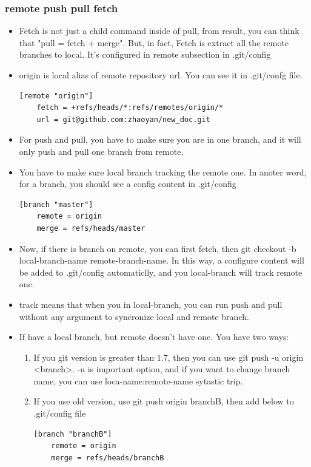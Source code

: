 \documentclass[a4paper,12pt,twoside]{book}
\begin{document}
\subsubsection{remote push pull fetch}
\begin{itemize}
		\item Fetch is not just a child command inside of pull, from result, you can think that "pull = fetch + merge". But, in fact, Fetch is extract all the remote branches to local. It's configured in remote subsection in .git/config

		\item origin is local alias of remote repository url. You can see it in .git/confg file.  

\begin{verbatim}
[remote "origin"]
	fetch = +refs/heads/*:refs/remotes/origin/*
	url = git@github.com:zhaoyan/new_doc.git
\end{verbatim}
				
\item For push and pull, you have to make sure you are in one branch, and it will only push and pull one branch from remote. 

\item You have to make sure local branch tracking the remote one. In anoter word, for a branch, you should see a config content in .git/config
\begin{verbatim}
[branch "master"]
	remote = origin
	merge = refs/heads/master
\end{verbatim}
\item Now, if there is branch on remote, you can first fetch, then git checkout -b local-branch-name remote-branch-name. In this way, a configure content will be added to .git/config automaticlly, and you local-branch will track remote one.
\item track means that when you in local-branch, you can run push and pull without any argument to syncronize local and remote branch.

\item If have a local branch, but remote doesn't have one. You have two ways:
\begin{enumerate}
		\item If you git version is greater than 1.7, then you can use git push -u origin <branch>. -u is important option, and if you want to change branch name, you can use loca-name:remote-name sytastic trip.
		\item If you use old version, use git push origin branchB, then add below to .git/config file
\begin{verbatim}
[branch "branchB"]
    remote = origin
	merge = refs/heads/branchB
\end{verbatim}
\end{enumerate}


\end{itemize}
\end{document}
